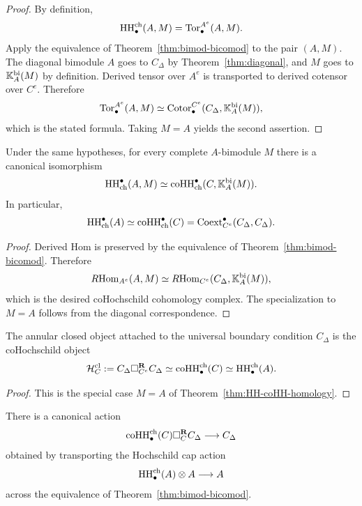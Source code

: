\begin{proof}
By definition,
\[
\operatorname{HH}^{\mathrm{ch}}_\bullet(A,M)=\operatorname{Tor}_\bullet^{A^e}(A,M).
\]
Apply the equivalence of Theorem~\ref{thm:bimod-bicomod} to the pair $(A,M)$.
The diagonal bimodule $A$ goes to $C_\Delta$ by Theorem~\ref{thm:diagonal}, and $M$ goes to
$\mathbb{K}_A^{\mathrm{bi}}(M)$ by definition. Derived tensor over $A^e$ is transported to derived cotensor
over $C^e$. Therefore
\[
\operatorname{Tor}_\bullet^{A^e}(A,M)\simeq \operatorname{Cotor}_\bullet^{C^e}(C_\Delta,\mathbb{K}_A^{\mathrm{bi}}(M)),
\]
which is the stated formula. Taking $M=A$ yields the second assertion.
\end{proof}

\begin{theorem}
\label{thm:HH-coHH-cohomology}
Under the same hypotheses, for every complete $A$-bimodule $M$ there is a canonical isomorphism
\[
\operatorname{HH}_{\mathrm{ch}}^\bullet(A,M)\simeq
\operatorname{coHH}_{\mathrm{ch}}^\bullet(C,\mathbb{K}_A^{\mathrm{bi}}(M)).
\]
In particular,
\[
\operatorname{HH}_{\mathrm{ch}}^\bullet(A)\simeq
\operatorname{coHH}_{\mathrm{ch}}^\bullet(C)
=
\operatorname{Coext}_{C^e}^\bullet(C_\Delta,C_\Delta).
\]
\end{theorem}

\begin{proof}
Derived Hom is preserved by the equivalence of Theorem~\ref{thm:bimod-bicomod}. Therefore
\[
R\!\operatorname{Hom}_{A^e}(A,M)\simeq R\!\operatorname{Hom}_{C^e}(C_\Delta,\mathbb{K}_A^{\mathrm{bi}}(M)),
\]
which is the desired coHochschild cohomology complex. The specialization to $M=A$ follows from the
diagonal correspondence.
\end{proof}

\begin{corollary}
\label{cor:annulus}
The annular closed object attached to the universal boundary condition $C_\Delta$ is the coHochschild
object
\[
\mathcal H_C^{\mathrm{cl}}
:=
C_\Delta \square_{C^e}^{\mathbf R} C_\Delta
\simeq
\operatorname{coHH}^{\mathrm{ch}}_\bullet(C)
\simeq
\operatorname{HH}^{\mathrm{ch}}_\bullet(A).
\]
\end{corollary}

\begin{proof}
This is the special case $M=A$ of Theorem~\ref{thm:HH-coHH-homology}.
\end{proof}

\begin{corollary}
\label{cor:cap}
There is a canonical action
\[
\operatorname{coHH}^{\mathrm{ch}}_\bullet(C)\square_C^{\mathbf R} C_\Delta \longrightarrow C_\Delta
\]
obtained by transporting the Hochschild cap action
\[
\operatorname{HH}^{\mathrm{ch}}_\bullet(A)\otimes A\longrightarrow A
\]
across the equivalence of Theorem~\ref{thm:bimod-bicomod}.
\end{corollary}

